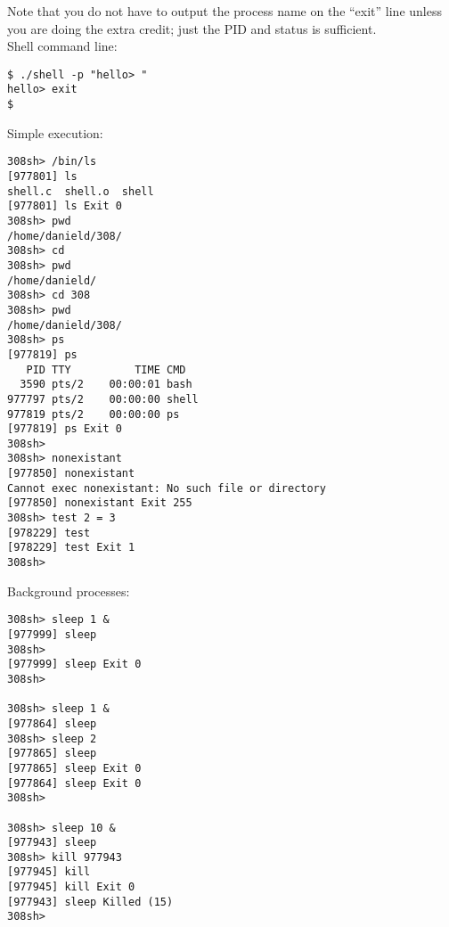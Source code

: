 \documentclass[letterpaper,10pt]{article}
\begin{document}
Note that you do not have to output the process name on the ``exit'' line unless you are doing the extra credit; just the PID and
status is sufficient.
\\[10pt]
Shell command line:
\begin{verbatim}
$ ./shell -p "hello> "
hello> exit
$
\end{verbatim}
Simple execution:
\begin{verbatim}
308sh> /bin/ls
[977801] ls
shell.c  shell.o  shell
[977801] ls Exit 0
308sh> pwd
/home/danield/308/
308sh> cd
308sh> pwd
/home/danield/
308sh> cd 308
308sh> pwd
/home/danield/308/
308sh> ps
[977819] ps
   PID TTY          TIME CMD
  3590 pts/2    00:00:01 bash
977797 pts/2    00:00:00 shell
977819 pts/2    00:00:00 ps
[977819] ps Exit 0
308sh>
308sh> nonexistant
[977850] nonexistant
Cannot exec nonexistant: No such file or directory
[977850] nonexistant Exit 255
308sh> test 2 = 3
[978229] test
[978229] test Exit 1
308sh>
\end{verbatim}
Background processes:
\begin{verbatim}
308sh> sleep 1 &
[977999] sleep
308sh>
[977999] sleep Exit 0
308sh>

308sh> sleep 1 &
[977864] sleep
308sh> sleep 2
[977865] sleep
[977865] sleep Exit 0
[977864] sleep Exit 0
308sh>

308sh> sleep 10 &
[977943] sleep
308sh> kill 977943
[977945] kill
[977945] kill Exit 0
[977943] sleep Killed (15)
308sh>
\end{verbatim}
\end{document}
